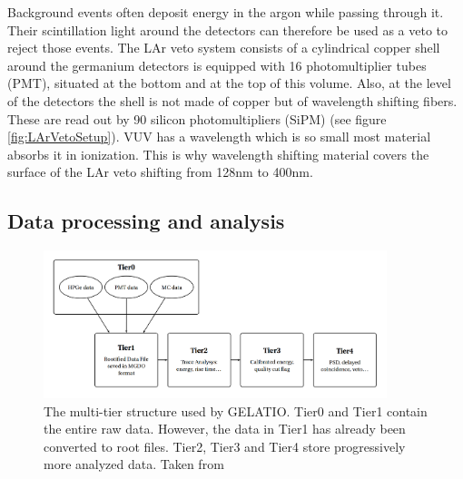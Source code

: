 \documentclass[encoding=utf8,british]{tumphthesis}
\begin{document}
Background events often deposit energy in the argon while passing through it.
Their scintillation light around the detectors can therefore be used as a veto to reject those events.
The LAr veto system consists of a cylindrical copper shell around the germanium detectors is equipped with 16 photomultiplier tubes (PMT), situated at the bottom and at the top of this volume.
Also, at the level of the detectors the shell is not made of copper but of wavelength shifting fibers.
These are read out by 90 silicon photomultipliers (SiPM)\cite{csathy_optical_2016} (see figure \ref{fig:LArVetoSetup}).
VUV has a wavelength which is so small most material absorbs it in ionization.
This is why wavelength shifting material covers the surface of the LAr veto shifting from 128nm to 400nm.
\\


\subsection{Data processing and analysis}
\label{sec:DataProc}

\label{sec:Resultsofgerda}
\begin{figure}[t!]
	\centering
		\includegraphics[width=100mm]{./Bilder/TierStructure.png}
		\caption{The multi-tier structure used by GELATIO. Tier0 and Tier1 contain the entire raw data. However, the data in Tier1 has already been converted to root files. Tier2, Tier3 and Tier4 store  progressively more analyzed data. Taken from \cite{agostini_gelatio:_2011}}
		\label{fig:TierStructure}
\end{figure}
\end{document}
